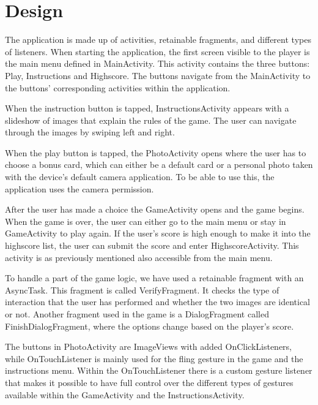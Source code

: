 \section{Design}
The application is made up of activities, retainable fragments, and different types of listeners. When starting the application, the first screen visible to the player is the main menu defined in MainActivity. This activity contains the three buttons: Play, Instructions and Highscore. The buttons navigate from the MainActivity to the buttons' corresponding activities within the application. 

When the instruction button is tapped, InstructionsActivity appears with a slideshow of images that explain the rules of the game. The user can navigate through the images by swiping left and right. \newline

When the play button is tapped, the PhotoActivity opens where the user has to choose a bonus card, which can either be a default card or a personal photo taken with the device’s default camera application. To be able to use this, the application uses the camera permission. \newline

After the user has made a choice the GameActivity opens and the game begins. When the game is over, the user can either go to the main menu or stay in GameActivity to play again. If the user’s score is high enough to make it into the highscore list, the user can submit the score and enter HighscoreActivity. This activity is as previously mentioned also accessible from the main menu. \newline

To handle a part of the game logic, we have used a retainable fragment with an AsyncTask. This fragment is called VerifyFragment. It checks the type of interaction that the user has performed and whether the two images are identical or not. Another fragment used in the game is a  DialogFragment called FinishDialogFragment, where the options change based on the player’s score. \newline

The buttons in PhotoActivity are ImageViews with added OnClickListeners, while OnTouchListener is mainly used for the fling gesture in the game and the instructions menu. Within the OnTouchListener there is a custom gesture listener that makes it possible to have full control over the different types of gestures available within the GameActivity and the InstructionsActivity.